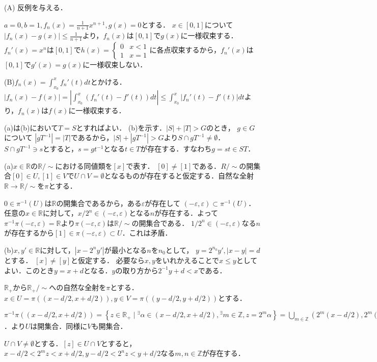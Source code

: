 \documentclass[
		book,
		head_space=20mm,
		foot_space=20mm,
		gutter=10mm,
		line_length=190mm
]{jlreq}
\begin{document}
(A) 反例を与える．

$a=0,b=1,f_n(x)=\frac{1}{n+1}x^{n+1},g(x)=0$とする．
$x\in[0,1]$について$|f_n(x)-g(x)|\le \frac{1}{n+1}$より，$f_n(x)$は$[0,1]$で$g(x)$に一様収束する．
$f_n'(x)=x^n$は$[0,1]$で$h(x)=\begin{cases}
    0&x<1\\
    1&x=1
\end{cases}$に各点収束するから，$f_n'(x)$は$[0,1]$で$g'(x)=g(x)$に一様収束しない．

(B)$f_n(x)=\int_{x_0}^x f_n'(t)dt$とかける．
$|f_n(x)-f(x)|=|\int_{x_0}^x (f_n'(t)-f'(t))dt|\le \int_{x_0}^x |f_n'(t)-f'(t)|dt$より，$f_n(x)$は$f(x)$に一様収束する．

(a)は(b)において$T=S$とすればよい．
(b)を示す．$|S|+|T|>G$のとき，
$g \in G$について
$|gT^{-1}|=|T|$であるから，$|S|+|gT^{-1}|>G$より$S\cap gT^{-1}\neq \emptyset$．
$S\cap gT^{-1} \ni s$とすると，$s=gt^{-1}$となる$t\in T$が存在する．すなわち$g=st\in ST$．

(a)$x\in \mathbb{R}$の$\mathbb{R}/\sim$における同値類を$[x]$で表す．
$[0]\neq[1]$である．$R/\sim$の開集合$[0]\in U,[1]\in V$で$U\cap V=\emptyset$となるものが存在すると仮定する．自然な全射$\mathbb{R}\rightarrow \mathbb{R}/\sim$を$\pi$とする．

$0\in \pi^{-1}(U)$は$\mathbb{R}$の開集合であるから，ある$\varepsilon$が存在して
$(-\varepsilon,\varepsilon)\subset \pi^{-1}(U)$．
任意の$x\in \mathbb{R}$に対して，$x/2^n\in (-\varepsilon,\varepsilon)$となる$n$が存在する．よって
$\pi^{-1}\pi(-\varepsilon,\varepsilon)=\mathbb{R}$より$\pi(-\varepsilon,\varepsilon)$は$\mathbb{R}/\sim$の開集合である．
$1/2^n\in(-\varepsilon,\varepsilon)$なる$n$が存在するから$[1]\in \pi(-\varepsilon,\varepsilon)\subset U$．これは矛盾．

(b)$x,y'\in \mathbb{R}$に対して，$|x-2^ny'|$が最小となる$n$を$n_0$として，
$y=2^{n_0}y',|x-y|=d$とする．
$[x]\neq [y]$と仮定する．
必要なら$x,y$をいれかえることで$x\le y$としてよい．このとき$y=x+d$となる．$y$の取り方から$2^{-1}y +d<x$である．

$\mathbb{R}_+$から$\mathbb{R}_+/\sim$への自然な全射を$\pi$とする．
$x\in U=\pi((x-d/2,x+d/2)),y\in V=\pi((y-d/2,y+d/2))$とする．

$\pi^{-1}\pi((x-d/2,x+d/2))=\left\{z\in \mathbb{R}_+\mid {}^\exists \alpha \in (x-d/2,x+d/2),{}^\exists m \in \mathbb{Z},z=2^m\alpha\right\}=\bigcup_{m\in \mathbb{Z}}(2^m(x-d/2),2^m(x+d/2))$．より$U$は開集合．同様に$V$も開集合．

$U\cap V\neq \emptyset$とする．$[z]\in U\cap V$とすると，
$x-d/2 < 2^mz < x+d/2,y-d/2 < 2^nz < y+d/2$なる$m,n\in \mathbb{Z}$が存在する．
\end{document}
